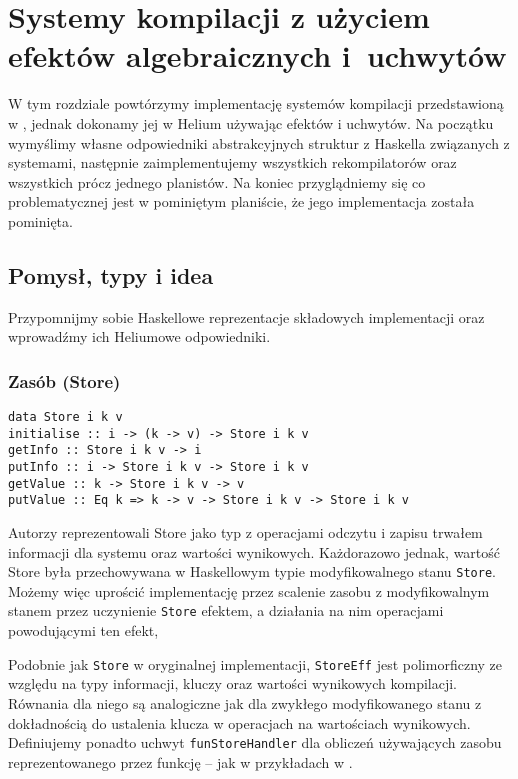 
\newcommand{\haskinl}[1]{\lstinline[style=haskell-inl]{#1}}
\newcommand{\helinl}[1]{\lstinline[style=Haleff-inl]{#1}}

\chapter{Systemy kompilacji z użyciem efektów algebraicznych i~uchwytów}

W tym rozdziale powtórzymy implementację systemów kompilacji przedstawioną w \BSaLC\cite{mokhov2018build}, jednak dokonamy jej w Helium używając efektów i uchwytów. Na początku wymyślimy własne odpowiedniki abstrakcyjnych struktur z Haskella związanych z systemami, następnie zaimplementujemy wszystkich rekompilatorów oraz wszystkich prócz jednego planistów. Na koniec przyglądniemy się co problematycznej jest w pominiętym planiście, że jego implementacja została pominięta.

\section{Pomysł, typy i idea}

Przypomnijmy sobie Haskellowe reprezentacje składowych implementacji oraz wprowadźmy ich Heliumowe odpowiedniki.

\subsection{Zasób (Store)}

\begin{lstlisting}[style=haskell-style]
data Store i k v
initialise :: i -> (k -> v) -> Store i k v
getInfo :: Store i k v -> i
putInfo :: i -> Store i k v -> Store i k v
getValue :: k -> Store i k v -> v
putValue :: Eq k => k -> v -> Store i k v -> Store i k v
\end{lstlisting}

Autorzy \BSaLC\cite{mokhov2018build} reprezentowali Store jako typ z operacjami odczytu i zapisu trwałem informacji dla systemu oraz wartości wynikowych. Każdorazowo jednak, wartość Store była przechowywana w Haskellowym typie modyfikowalnego stanu \haskinl{Store}. Możemy więc uprościć implementację przez scalenie zasobu z modyfikowalnym stanem przez uczynienie \haskinl{Store} efektem, a działania na nim operacjami powodującymi ten efekt,



Podobnie jak \haskinl{Store} w oryginalnej implementacji, \helinl{StoreEff} jest polimorficzny ze względu na typy informacji, kluczy oraz wartości wynikowych kompilacji. Równania dla niego są analogiczne jak dla zwykłego modyfikowanego stanu z dokładnością do ustalenia klucza w operacjach na wartościach wynikowych. Definiujemy ponadto uchwyt \helinl{funStoreHandler} dla obliczeń używających zasobu reprezentowanego przez funkcję -- jak w przykładach w \BSaLC.

